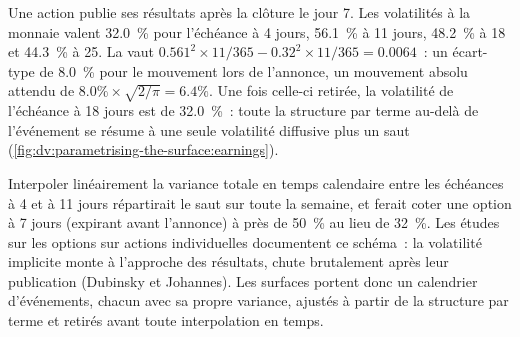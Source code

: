 \begin{example}\label{ex:dv:parametrising-the-surface:earnings}
Une action publie ses résultats après la clôture le jour 7. Les volatilités à la monnaie valent 32.0~\% pour l'échéance à 4
jours, 56.1~\% à 11 jours, 48.2~\% à 18 et 44.3~\% à 25. La  vaut
$0.561^2\times11/365-0.32^2\times11/365=0.0064$~: un écart-type de 8.0~\% pour le mouvement lors de
l'annonce, un mouvement absolu attendu de $8.0\%\times\sqrt{2/\pi}=6.4\%$. Une fois celle-ci retirée, la
volatilité de l'échéance à 18 jours est de 32.0~\%~: toute la structure par terme au-delà de l'événement se résume à une seule
volatilité diffusive plus un saut (\cref{fig:dv:parametrising-the-surface:earnings}).
\end{example}

Interpoler linéairement la variance totale en temps calendaire entre les échéances à 4 et à 11 jours répartirait
le saut sur toute la semaine, et ferait coter une option à 7 jours (expirant avant l'annonce) à
près de 50~\% au lieu de 32~\%. Les études sur les options sur actions individuelles documentent ce schéma~: la volatilité implicite
monte à l'approche des résultats, chute brutalement après leur publication (Dubinsky et Johannes). Les surfaces
portent donc un calendrier d'événements, chacun avec sa propre variance, ajustés à partir de la structure par terme
et retirés avant toute interpolation en temps.

\begin{omfigure}

\label{fig:dv:parametrising-the-surface:earnings}
\end{omfigure}

